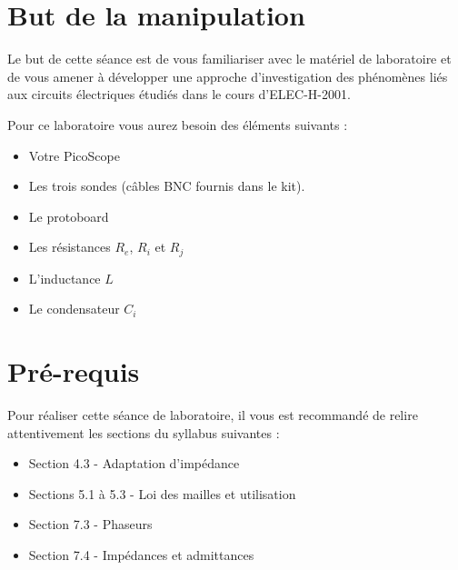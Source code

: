 \pagestyle{fancy}
\cfoot{}



\setlength{\parskip}{0.5cm plus4mm minus3mm} %
\setlength{\parindent}{0pt}




\section{But de la manipulation}
Le but de cette séance est de vous familiariser avec le matériel de laboratoire et de vous amener à développer une approche d'investigation des phénomènes liés aux circuits électriques étudiés dans le cours d'ELEC-H-2001.

Pour ce laboratoire vous aurez besoin des éléments suivants :
\begin{itemize}
    \item Votre PicoScope
    \item Les trois sondes (câbles BNC fournis dans le kit).
    \item Le protoboard
    \item Les résistances $R_e$, $R_i$ et $R_j$
    \item L'inductance $L$
    \item Le condensateur $C_i$
\end{itemize}

\section{Pré-requis}
Pour réaliser cette séance de laboratoire, il vous est recommandé de relire attentivement les sections du syllabus suivantes :
\begin{itemize}
    \item Section 4.3 - Adaptation d'impédance
    \item Sections 5.1 à 5.3 - Loi des mailles et utilisation
    \item Section 7.3 - Phaseurs
    \item Section 7.4 - Impédances et admittances
\end{itemize}

